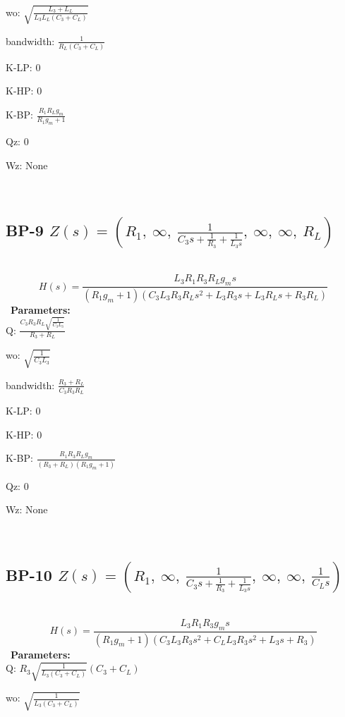 \documentclass{article}
\begin{document}
wo: $\sqrt{\frac{L_{3} + L_{L}}{L_{3} L_{L} \left(C_{3} + C_{L}\right)}}$\ 

bandwidth: $\frac{1}{R_{L} \left(C_{3} + C_{L}\right)}$\ 

K-LP: $0$\ 

K-HP: $0$\ 

K-BP: $\frac{R_{1} R_{L} g_{m}}{R_{1} g_{m} + 1}$\ 

Qz: $0$\ 

Wz: $\text{None}$\ 

\ 

\subsection{BP-9 $Z(s) = \left( R_{1}, \  \infty, \  \frac{1}{C_{3} s + \frac{1}{R_{3}} + \frac{1}{L_{3} s}}, \  \infty, \  \infty, \  R_{L}\right)$ } \ 
\textbf{\[H(s) = \frac{L_{3} R_{1} R_{3} R_{L} g_{m} s}{\left(R_{1} g_{m} + 1\right) \left(C_{3} L_{3} R_{3} R_{L} s^{2} + L_{3} R_{3} s + L_{3} R_{L} s + R_{3} R_{L}\right)}\] } \ 
\textbf{Parameters:}\\ 

Q: $\frac{C_{3} R_{3} R_{L} \sqrt{\frac{1}{C_{3} L_{3}}}}{R_{3} + R_{L}}$\ 

wo: $\sqrt{\frac{1}{C_{3} L_{3}}}$\ 

bandwidth: $\frac{R_{3} + R_{L}}{C_{3} R_{3} R_{L}}$\ 

K-LP: $0$\ 

K-HP: $0$\ 

K-BP: $\frac{R_{1} R_{3} R_{L} g_{m}}{\left(R_{3} + R_{L}\right) \left(R_{1} g_{m} + 1\right)}$\ 

Qz: $0$\ 

Wz: $\text{None}$\ 

\ 

\subsection{BP-10 $Z(s) = \left( R_{1}, \  \infty, \  \frac{1}{C_{3} s + \frac{1}{R_{3}} + \frac{1}{L_{3} s}}, \  \infty, \  \infty, \  \frac{1}{C_{L} s}\right)$ } \ 
\textbf{\[H(s) = \frac{L_{3} R_{1} R_{3} g_{m} s}{\left(R_{1} g_{m} + 1\right) \left(C_{3} L_{3} R_{3} s^{2} + C_{L} L_{3} R_{3} s^{2} + L_{3} s + R_{3}\right)}\] } \ 
\textbf{Parameters:}\\ 

Q: $R_{3} \sqrt{\frac{1}{L_{3} \left(C_{3} + C_{L}\right)}} \left(C_{3} + C_{L}\right)$\ 

wo: $\sqrt{\frac{1}{L_{3} \left(C_{3} + C_{L}\right)}}$\ 
\end{document}

